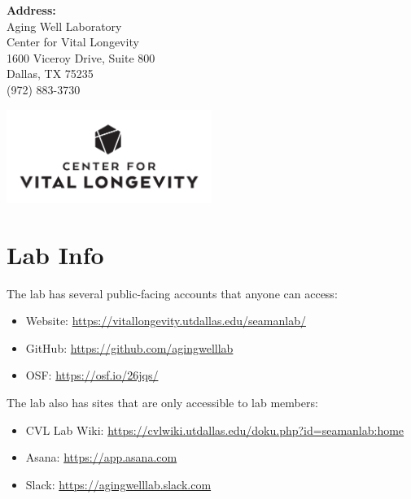\documentclass[
]{book}
\providecommand{\tightlist}{%
  \setlength{\itemsep}{0pt}\setlength{\parskip}{0pt}}
\begin{document}
\textbf{Address:}\\
Aging Well Laboratory\\
Center for Vital Longevity\\
1600 Viceroy Drive, Suite 800\\
Dallas, TX 75235\\
(972) 883-3730

\includegraphics[width=0.5\textwidth,height=\textheight]{images/CVL-B-Stacked.png}

\hypertarget{lab-info}{%
\section{Lab Info}\label{lab-info}}

The lab has several public-facing accounts that anyone can access:

\begin{itemize}
\tightlist
\item
  Website: \url{https://vitallongevity.utdallas.edu/seamanlab/}
\item
  GitHub: \url{https://github.com/agingwelllab}
\item
  OSF: \url{https://osf.io/26jqs/}
\end{itemize}

The lab also has sites that are only accessible to lab members:

\begin{itemize}
\tightlist
\item
  CVL Lab Wiki: \url{https://cvlwiki.utdallas.edu/doku.php?id=seamanlab:home}
\item
  Asana: \url{https://app.asana.com}
\item
  Slack: \url{https://agingwelllab.slack.com}
\end{itemize}
\end{document}
